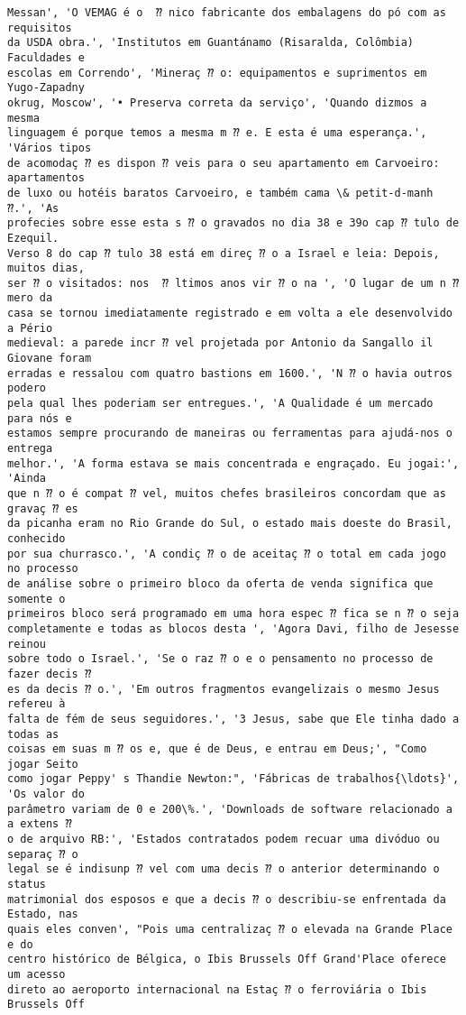 \documentclass[10pt]{article}
\begin{document}
\begin{Verbatim}[commandchars=\\\{\}]
Messan', 'O VEMAG é o  ⁇ nico fabricante dos embalagens do pó com as requisitos
da USDA obra.', 'Institutos em Guantánamo (Risaralda, Colômbia) Faculdades e
escolas em Correndo', 'Mineraç ⁇ o: equipamentos e suprimentos em Yugo-Zapadny
okrug, Moscow', '• Preserva correta da serviço', 'Quando dizmos a mesma
linguagem é porque temos a mesma m ⁇ e. E esta é uma esperança.', 'Vários tipos
de acomodaç ⁇ es dispon ⁇ veis para o seu apartamento em Carvoeiro: apartamentos
de luxo ou hotéis baratos Carvoeiro, e também cama \& petit-d-manh ⁇.', 'As
profecies sobre esse esta s ⁇ o gravados no dia 38 e 39o cap ⁇ tulo de Ezequil.
Verso 8 do cap ⁇ tulo 38 está em direç ⁇ o a Israel e leia: Depois, muitos dias,
ser ⁇ o visitados: nos  ⁇ ltimos anos vir ⁇ o na ', 'O lugar de um n ⁇ mero da
casa se tornou imediatamente registrado e em volta a ele desenvolvido a Pério
medieval: a parede incr ⁇ vel projetada por Antonio da Sangallo il Giovane foram
erradas e ressalou com quatro bastions em 1600.', 'N ⁇ o havia outros podero
pela qual lhes poderiam ser entregues.', 'A Qualidade é um mercado para nós e
estamos sempre procurando de maneiras ou ferramentas para ajudá-nos o entrega
melhor.', 'A forma estava se mais concentrada e engraçado. Eu jogai:', 'Ainda
que n ⁇ o é compat ⁇ vel, muitos chefes brasileiros concordam que as gravaç ⁇ es
da picanha eram no Rio Grande do Sul, o estado mais doeste do Brasil, conhecido
por sua churrasco.', 'A condiç ⁇ o de aceitaç ⁇ o total em cada jogo no processo
de análise sobre o primeiro bloco da oferta de venda significa que somente o
primeiros bloco será programado em uma hora espec ⁇ fica se n ⁇ o seja
completamente e todas as blocos desta ', 'Agora Davi, filho de Jesesse reinou
sobre todo o Israel.', 'Se o raz ⁇ o e o pensamento no processo de fazer decis ⁇
es da decis ⁇ o.', 'Em outros fragmentos evangelizais o mesmo Jesus refereu à
falta de fém de seus seguidores.', '3 Jesus, sabe que Ele tinha dado a todas as
coisas em suas m ⁇ os e, que é de Deus, e entrau em Deus;', "Como jogar Seito
como jogar Peppy' s Thandie Newton:", 'Fábricas de trabalhos{\ldots}', 'Os valor do
parâmetro variam de 0 e 200\%.', 'Downloads de software relacionado a a extens ⁇
o de arquivo RB:', 'Estados contratados podem recuar uma divóduo ou separaç ⁇ o
legal se é indisunp ⁇ vel com uma decis ⁇ o anterior determinando o status
matrimonial dos esposos e que a decis ⁇ o describiu-se enfrentada da Estado, nas
quais eles conven', "Pois uma centralizaç ⁇ o elevada na Grande Place e do
centro histórico de Bélgica, o Ibis Brussels Off Grand'Place oferece um acesso
direto ao aeroporto internacional na Estaç ⁇ o ferroviária o Ibis Brussels Off

\end{Verbatim}
\end{document}
